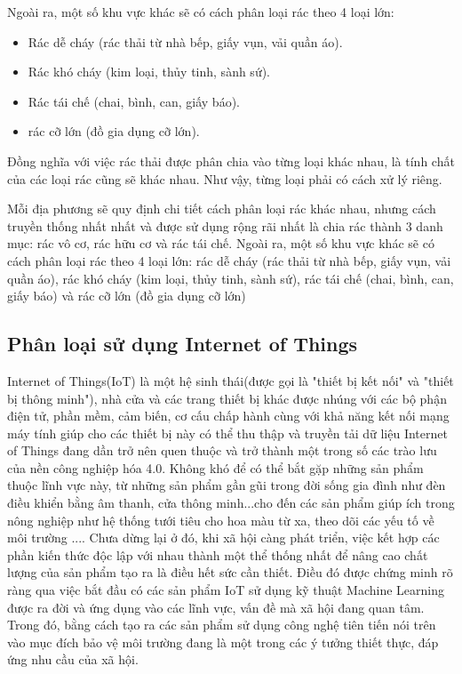 Ngoài ra, một số khu vực khác sẽ có cách phân loại rác theo 4 loại lớn: 
    \begin{itemize}
        \item Rác dễ cháy (rác thải từ nhà bếp, giấy vụn, vải quần áo).
        \item Rác khó cháy (kim loại, thủy tinh, sành sứ).
        \item Rác tái chế (chai, bình, can, giấy báo).
        \item rác cỡ lớn (đồ gia dụng cỡ lớn).
    \end{itemize}
  

Đồng nghĩa với việc rác thải được phân chia vào từng loại khác nhau, là tính chất của các loại rác cũng sẽ khác nhau. Như vậy, từng loại phải có cách xử lý riêng.

Mỗi địa phương sẽ quy định chi tiết cách phân loại rác khác nhau, nhưng cách truyền thống nhất nhất và được sử dụng rộng rãi nhất là chia rác thành 3 danh mục: rác vô cơ, rác hữu cơ và rác tái chế.
Ngoài ra, một số khu vực khác sẽ có cách phân loại rác theo 4 loại lớn: rác dễ cháy (rác thải từ nhà bếp, giấy vụn, vải quần áo), rác khó cháy (kim loại, thủy tinh, sành sứ), rác tái chế (chai, bình, can, giấy báo) và rác cỡ lớn (đồ gia dụng cỡ lớn)

\subsection{Phân loại sử dụng Internet of Things}
Internet of Things(IoT) là một hệ sinh thái(được gọi là "thiết bị kết nối" và "thiết bị thông minh"), nhà cửa và các trang thiết bị khác được nhúng với các bộ phận điện tử, phần mềm, cảm biến, cơ cấu chấp hành cùng với khả năng kết nối mạng máy tính giúp cho các thiết bị này có thể thu thập và truyền tải dữ liệu
Internet of Things đang dần trở nên quen thuộc và trở thành một trong số các trào lưu của nền công nghiệp hóa 4.0.
Không khó để có thể bắt gặp những sản phẩm thuộc lĩnh vực này, từ những sản phẩm gần gũi trong đời sống gia đình như đèn điều khiển bằng âm thanh, cửa thông minh...cho đến các sản phẩm giúp ích trong nông nghiệp như hệ thống tưới tiêu cho hoa màu từ xa, theo dõi các yếu tố về môi trường .... 
Chưa dừng lại ở đó, khi xã hội càng phát triển, việc kết hợp các phần kiến thức độc lập với nhau thành một thể thống nhất để nâng cao chất lượng của sản phẩm tạo ra là điều hết sức cần thiết.
Điều đó được chứng minh rõ ràng qua việc bắt đầu có các sản phẩm IoT sử dụng kỹ thuật Machine Learning được ra đời và ứng dụng vào các lĩnh vực, vấn đề mà xã hội đang quan tâm.
Trong đó, bằng cách tạo ra các sản phẩm sử dụng công nghệ tiên tiến nói trên vào mục đích bảo vệ môi trường đang là một trong các ý tưởng thiết thực, đáp ứng nhu cầu của xã hội.
 
